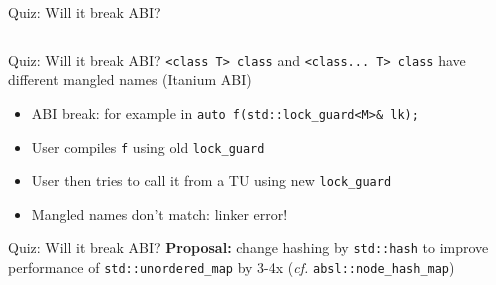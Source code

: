 \begin{frame}[fragile]{Quiz: Will it break ABI?}
    \begin{columns}[t]
        \begin{column}{.4\textwidth}
        \end{column}
        \begin{column}{.5\textwidth}
        \end{column}
    \end{columns}
\end{frame}

\begin{frame}[fragile]{Quiz: Will it break ABI?}
    \texttt{<class T> class} and \texttt{<class... T> class} have different mangled names (Itanium ABI)
    \begin{itemize}
        \item \textcolor{vertexDarkRed}{ABI break:} for example in \texttt{auto f(std::lock\_guard<M>\& lk);}
        \item User compiles \texttt{f} using old \texttt{lock\_guard}
        \item User then tries to call it from a TU using new \texttt{lock\_guard}
        \item Mangled names don't match: linker error!
    \end{itemize}
\end{frame}

\begin{frame}{Quiz: Will it break ABI?}
    \textbf{Proposal:} change hashing by \texttt{std::hash} to improve performance of \texttt{std::unordered\_map} by 3-4x (\textit{cf.} \texttt{absl::node\_hash\_map})

    \vspace*{5mm}

\end{frame}

